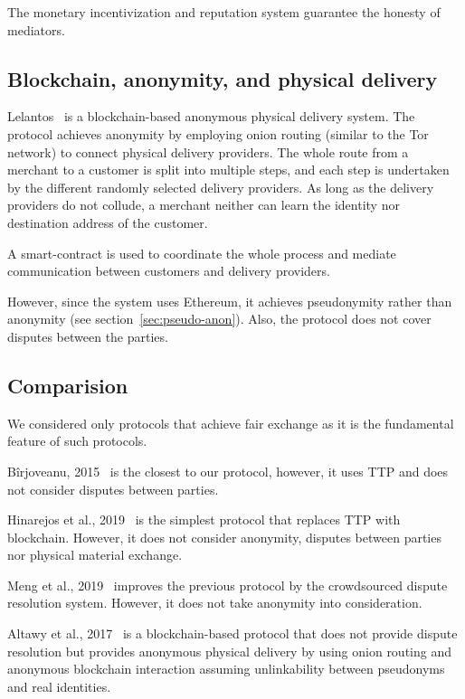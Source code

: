 The monetary incentivization and reputation system guarantee the honesty of mediators.

\subsection{Blockchain, anonymity, and physical delivery}\label{lelantos-a-blockchain-based-anonymous-physical-delivery-system}

Lelantos~\cite{altawyLelantosBlockchainBasedAnonymous2017} is a blockchain-based anonymous
physical delivery system. The protocol achieves anonymity by employing onion routing (similar to the Tor network) to connect physical delivery providers. The whole route from a merchant to a customer is split into multiple steps, and each step is undertaken by the different randomly selected delivery providers. As long as the delivery providers do not collude, a merchant neither can learn the identity nor destination address of the customer.

A smart-contract is used to coordinate the whole process and
mediate communication between customers and delivery providers.

However, since the system uses Ethereum, it achieves pseudonymity rather than anonymity (see section~\ref{sec:pseudo-anon}). Also, the protocol does not cover disputes between the parties.

\subsection{Comparision}

We considered only protocols that achieve fair exchange as it is the fundamental feature of such protocols.



Bîrjoveanu, 2015~\cite{birjoveanuAnonymityFairexchangeEcommerce2015} is the closest to our protocol, however, it uses TTP and does not consider disputes between parties.

Hinarejos et al., 2019~\cite{hinarejosSolutionSecureCertified2019} is the simplest protocol that replaces TTP with blockchain. However, it does not consider anonymity, disputes between parties nor physical material exchange.

Meng et al., 2019~\cite{mengThemisDecentralizedEscrow2019} improves the previous protocol by the crowdsourced dispute resolution system. However, it does not take anonymity into consideration.

Altawy et al., 2017~\cite{altawyLelantosBlockchainBasedAnonymous2017} is a blockchain-based protocol that does not provide dispute resolution but provides anonymous physical delivery by using onion routing and anonymous blockchain interaction assuming unlinkability between pseudonyms and real identities.

